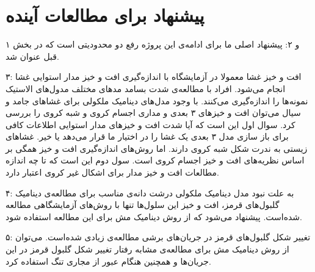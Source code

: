 %
%
%
\section{
پیشنهاد برای مطالعات آینده
}

۱ و ۲: پیشنهاد اصلی ما برای ادامه‌ی این پروژه رفع دو محدودیتی است که در بخش قبل عنوان شد. 

۳: افت و خیز غشا معمولا در آزمایشگاه با اندازه‌گیری افت و خیز مدار استوایی غشا انجام می‌شود. افراد با مطالعه‌ی شدت‌ بسامد مد‌های مختلف مدول‌های الاستیک نمونه‌ها  را اندازه‌گیری می‌کنند. با وجود مدل‌های دینامیک ملکولی برای غشاها‌ی جامد و سیال می‌توان افت‌ و خیز‌های ۳ بعدی و مداری اجسام کروی و شبه کروی را بررسی کرد. سوال اول این است که آیا شدت افت و خیز‌های مدار استوایی اطلاعات کافی برای باز سازی مدل ۳ بعدی یک غشا را در اختیار ما قرار می‌دهد یا خیر. غشا‌های زیستی به ندرت شکل شبه کروی دارند. اما روش‌های اندازه‌گیری افت و خیز همگی بر اساس نظریه‌های افت و خیز اجسام کروی است. سول دوم این است که تا چه اندازه مطالعات افت و خیز مدار برای اشکال غیر کروی اعتبار دارد.

۴: به علت نبود مدل دینامیک ملکولی درشت دانه‌ی مناسب برای مطالعه‌ی دینامیک گلبول‌های قرمز، افت و خیز این سلول‌ها تنها با روش‌های آزمایشگاهی مطالعه شده‌است. پیشنهاد می‌شود که از روش دینامیک مش برای این مطالعه استفاده شود. 

۵: تغییر شکل گلبول‌های قرمز در جریان‌های برشی مطالعه‌ی زیادی شده‌است. می‌توان از روش دینامیک مش  برای مطالعه‌ی مشابه رفتار تغییر شکل گلبول قرمز در این جریان‌ها و همچنین هنگام عبور از مجاری تنگ استفاده کرد. 








